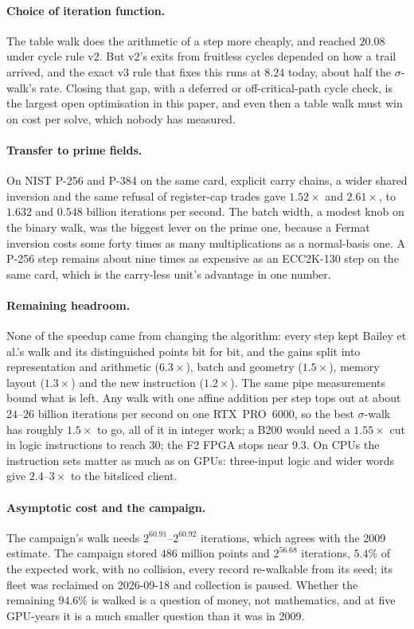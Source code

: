 \paragraph{Choice of iteration function.} The table walk
does the arithmetic of a step more cheaply, and reached $20.08$ under
cycle rule v2. But v2's exits from fruitless cycles depended on how a
trail arrived, and the exact v3 rule that fixes this runs at $8.24$
today, about half the $\sigma$-walk's rate. Closing that gap, with a deferred or off-critical-path cycle
check, is the largest open optimisation in this paper, and even then a
table walk must win on cost per solve, which nobody has measured.

\paragraph{Transfer to prime fields.} On NIST P-256 and P-384 on the same card, explicit carry
chains, a wider shared inversion and the same refusal of register-cap
trades gave $1.52\times$ and $2.61\times$, to $1.632$ and $0.548$ billion
iterations per second. The batch width, a modest knob on the binary
walk, was the biggest lever on the prime one, because a Fermat
inversion costs some forty times as many multiplications as a
normal-basis one. A P-256 step remains about nine times as expensive
as an ECC2K-130 step on the same card, which is the carry-less unit's
advantage in one number.

\paragraph{Remaining headroom.} None of the speedup
came from changing the algorithm: every step kept Bailey et al.'s walk
and its distinguished points bit for bit, and the gains split into
representation and arithmetic ($6.3\times$), batch and geometry
($1.5\times$), memory layout ($1.3\times$) and the new instruction
($1.2\times$). The same pipe measurements bound what is left. Any walk with
one affine addition per step tops out at about $24$--$26$ billion
iterations per second on one RTX~PRO~6000, so the best $\sigma$-walk has
roughly $1.5\times$ to go, all of it in integer work; a B200 would need a
$1.55\times$ cut in logic instructions to reach $30$; the F2 FPGA stops near
$9.3$. On CPUs the instruction sets matter as much as on GPUs: three-input
logic and wider words give $2.4$--$3\times$ to the bitsliced client.

\paragraph{Asymptotic cost and the campaign.} The campaign's walk needs $2^{60.91}$--$2^{60.92}$ iterations,
which agrees with the 2009 estimate. The campaign stored $486$ million
points and $2^{56.68}$ iterations, $5.4\%$ of the expected work, with no
collision, every record re-walkable from its seed; its fleet was
reclaimed on 2026-09-18 and collection is paused. Whether the remaining
$94.6\%$ is walked is a question of money, not mathematics, and at five
GPU-years it is a much smaller question than it was in 2009.
